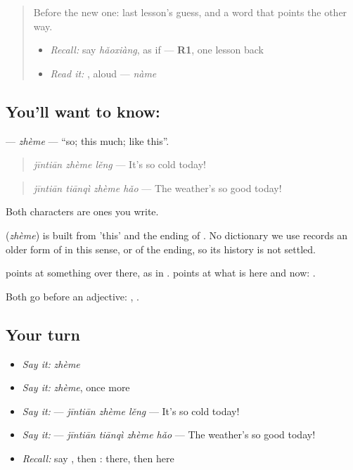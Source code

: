\label{lesson:ZH-C280-zheme}



\begin{quote}
Before the new one: last lesson's guess, and a word that points the other way.

\begin{itemize}
\raggedright
  \item \emph{Recall:} say \emph{hǎoxiàng}, as if — \textbf{R1}, one lesson back
  \item \emph{Read it:} , aloud — \emph{nàme}
\end{itemize}
\end{quote}

\subsection*{You'll want to know: }
\textbf{} — \emph{zhème} — \textquotedblleft{}so; this much; like this\textquotedblright{}.

\begin{quote}
\textbf{} \emph{jīntiān zhème lěng} — It's so cold today!
\end{quote}

\begin{quote}
\textbf{} \emph{jīntiān tiānqì zhème hǎo} — The weather's so good today!
\end{quote}

Both characters are ones you write.

\begin{cousinweb}
\textbf{} (\emph{zhème}) is built from  'this' and the ending  of . No dictionary we use records an older form of  in this sense, or of the ending, so its history is not settled.
\end{cousinweb}

\begin{grammarlens}[title={What you've built}]
 points at something over there, as in .  points at what is here and now: .

Both go before an adjective: , .
\end{grammarlens}

\subsection*{Your turn}
\begin{itemize}
\raggedright
  \item \emph{Say it:} \emph{zhème}
  \item \emph{Say it:} \emph{zhème}, once more
  \item \emph{Say it:}  — \emph{jīntiān zhème lěng} — It's so cold today!
  \item \emph{Say it:}  — \emph{jīntiān tiānqì zhème hǎo} — The weather's so good today!
  \item \emph{Recall:} say , then : there, then here
\end{itemize}

